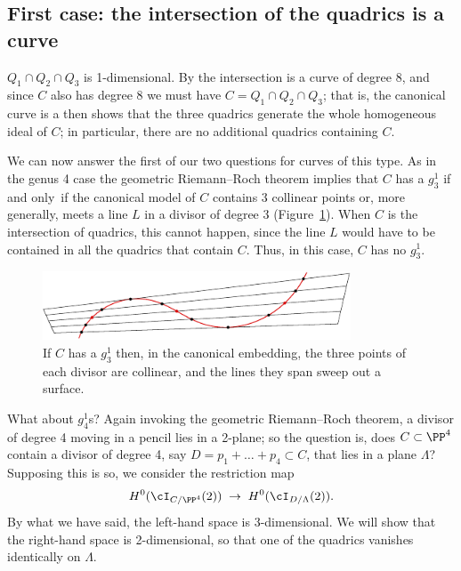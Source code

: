 \subsection*{First case: the intersection of the quadrics is a curve}

$Q_1 \cap Q_2 \cap Q_3$ is
1-dimensional.  By
the intersection is a curve of
degree 8, and since $C$ also has degree 8 we must have
$C=Q_1 \cap Q_2 \cap Q_3$; that is, the canonical curve is a
%
%
then shows that the three quadrics
generate the
whole homogeneous ideal of $C$; in particular, there are no additional
quadrics containing $C$.

We can now answer the first of our two questions for curves of this
type. As in the genus 4 case the geometric Riemann--Roch theorem
%
implies that $C$ has a $g^1_3$ if and only~if the canonical model of
$C$ contains 3 collinear points or, more generally, meets a line $L$
in a divisor of degree 3 (Figure~\ref{3 collinear points from g13}).
When $C$ is the intersection of quadrics, this cannot happen, since
the line $L$ would have to be contained in all the quadrics that
contain $C$. Thus, in this case,
$C$ has no $g^1_3$.

\begin{figure}
\centerline {\includegraphics[width=3.6in]{"main/Fig08-5"}}
\caption{If $C$ has a $g^{1}_{3}$ then, in the canonical embedding, the three
points
of each divisor are collinear, and the lines they span sweep out a surface.
}
\label{3 collinear points from g13}
\end{figure}


What about $g^1_4$s? Again invoking the geometric Riemann--Roch
%
theorem, a divisor of degree 4 moving in a pencil lies in a 2-plane;
so the question is, does $C \subset \PP^4$ contain a divisor of degree
4, say $D = p_1+\dots +p_4 \subset C$, that lies in a plane $\Lambda$?
Supposing this is so, we consider the restriction map
$$
H^0(\cI_{C/\PP^4}(2)) \; \to \; H^0(\cI_{D/\Lambda}(2)).
$$
By what we have said, the left-hand space is 3-dimensional.
We will show that the right-hand space
is 2-dimensional, so that one of the quadrics vanishes identically on $\Lambda$.

